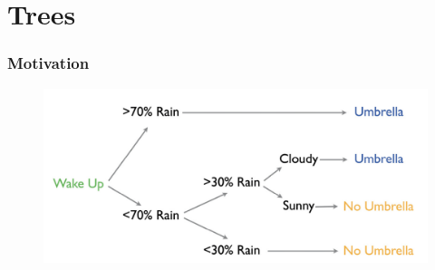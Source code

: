 \documentclass[
  shownotes,
  xcolor={svgnames},
  hyperref={colorlinks,citecolor=DarkBlue,linkcolor=DarkRed,urlcolor=DarkBlue}
  ]{beamer}
\begin{document}
\section{Trees}

\begin{frame}[fragile]
\frametitle{Motivation}

 \begin{figure}[H] \centering
            \captionsetup{justification=centering}
              \includegraphics[scale=0.15]{figures/cart_intro}                           
 \end{figure}

\end{frame}
\end{document}
